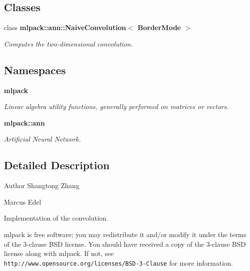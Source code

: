 \subsection*{Classes}
\begin{DoxyCompactItemize}
\item 
class {\bf mlpack\+::ann\+::\+Naive\+Convolution$<$ Border\+Mode $>$}
\begin{DoxyCompactList}\small\item\em Computes the two-\/dimensional convolution. \end{DoxyCompactList}\end{DoxyCompactItemize}
\subsection*{Namespaces}
\begin{DoxyCompactItemize}
\item 
 {\bf mlpack}
\begin{DoxyCompactList}\small\item\em Linear algebra utility functions, generally performed on matrices or vectors. \end{DoxyCompactList}\item 
 {\bf mlpack\+::ann}
\begin{DoxyCompactList}\small\item\em Artificial Neural Network. \end{DoxyCompactList}\end{DoxyCompactItemize}


\subsection{Detailed Description}
\begin{DoxyAuthor}{Author}
Shangtong Zhang 

Marcus Edel
\end{DoxyAuthor}
Implementation of the convolution.

mlpack is free software; you may redistribute it and/or modify it under the terms of the 3-\/clause B\+SD license. You should have received a copy of the 3-\/clause B\+SD license along with mlpack. If not, see {\tt http\+://www.\+opensource.\+org/licenses/\+B\+S\+D-\/3-\/\+Clause} for more information. 